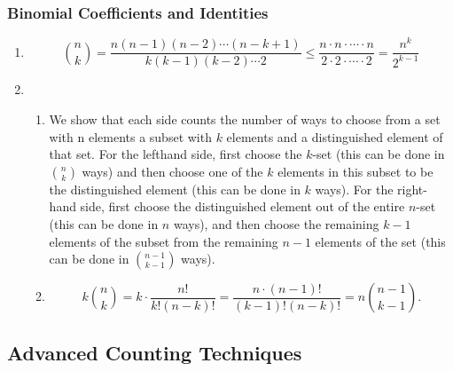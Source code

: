 \documentclass{sig-alternate-05-2015}
\begin{document}
\subsubsection{Binomial Coefficients and Identities}
\begin{enumerate}
	\item \begin{equation}
	\binom{n}{k} = \frac{n(n - 1)(n - 2) \cdots (n - k + 1)}{k(k - 1)(k - 2) \cdots 2} \le \frac{n \cdot n \cdot \cdots \cdot n}{2 \cdot 2 \cdot \cdots \cdot 2} = \frac{n^k}{2^{k - 1}}
	\end{equation}
	
	\item \begin{enumerate}
		\item We show that each side counts the number of ways
		to choose from a set with n elements a subset with $k$ elements
		and a distinguished element of that set. For the lefthand
		side, first choose the $k$-set (this can be done in $\binom{n}{k}$ ways)
		and then choose one of the $k$ elements in this subset to be
		the distinguished element (this can be done in $k$ ways). For
		the right-hand side, first choose the distinguished element out
		of the entire $n$-set (this can be done in $n$ ways), and then
		choose the remaining $k - 1$ elements of the subset from the
		remaining $n - 1$ elements of the set (this can be done in $\binom{n - 1}{k - 1}$ ways).
		\item \begin{equation}
			k \binom{n}{k} = k \cdot \frac{n!}{k!(n - k)!} = \frac{n \cdot (n - 1)!}{(k - 1)!(n - k)!} = n \binom{n - 1}{k - 1}.
		\end{equation}
	\end{enumerate}
	
\end{enumerate}

\subsection{Advanced Counting Techniques}
\end{document}
